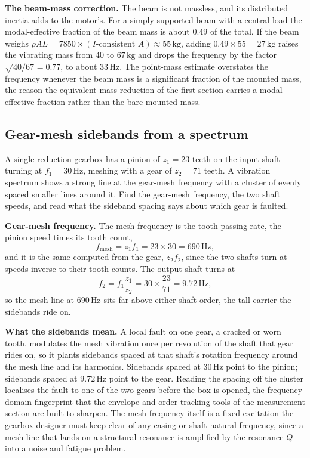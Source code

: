 \textbf{The beam-mass correction.} The beam is not massless, and its
distributed inertia adds to the motor's. For a simply supported beam
with a central load the modal-effective fraction of the beam mass is
about $0.49$ of the total. If the beam weighs $\rho A L = 7850\times
(I\text{-consistent }A)\approx 55\,\si{\kilogram}$, adding $0.49\times
55 = 27\,\si{\kilogram}$ raises the vibrating mass from $40$ to
$67\,\si{\kilogram}$ and drops the frequency by the factor
$\sqrt{40/67} = 0.77$, to about $33\,\si{\hertz}$. The point-mass
estimate overstates the frequency whenever the beam mass is a
significant fraction of the mounted mass, the reason the equivalent-mass
reduction of the first section carries a modal-effective fraction rather
than the bare mounted mass.

\subsection{Gear-mesh sidebands from a spectrum}

A single-reduction gearbox has a pinion of $z_1 = 23$ teeth on the input
shaft turning at $f_1 = 30\,\si{\hertz}$, meshing with a gear of $z_2 =
71$ teeth. A vibration spectrum shows a strong line at the gear-mesh
frequency with a cluster of evenly spaced smaller lines around it. Find
the gear-mesh frequency, the two shaft speeds, and read what the
sideband spacing says about which gear is faulted.

\textbf{Gear-mesh frequency.} The mesh frequency is the tooth-passing
rate, the pinion speed times its tooth count,
\[
f_{\text{mesh}} = z_1 f_1 = 23\times 30 = 690\,\si{\hertz},
\]
and it is the same computed from the gear, $z_2 f_2$, since the two
shafts turn at speeds inverse to their tooth counts. The output shaft
turns at
\[
f_2 = f_1\frac{z_1}{z_2} = 30\times\frac{23}{71} = 9.72\,\si{\hertz},
\]
so the mesh line at $690\,\si{\hertz}$ sits far above either shaft
order, the tall carrier the sidebands ride on.

\textbf{What the sidebands mean.} A local fault on one gear, a cracked
or worn tooth, modulates the mesh vibration once per revolution of the
shaft that gear rides on, so it plants sidebands spaced at that shaft's
rotation frequency around the mesh line and its harmonics. Sidebands
spaced at $30\,\si{\hertz}$ point to the pinion; sidebands spaced at
$9.72\,\si{\hertz}$ point to the gear. Reading the spacing off the
cluster localises the fault to one of the two gears before the box is
opened, the frequency-domain fingerprint that the envelope and
order-tracking tools of the measurement section are built to sharpen.
The mesh frequency itself is a fixed excitation the gearbox designer
must keep clear of any casing or shaft natural frequency, since a mesh
line that lands on a structural resonance is amplified by the resonance
$Q$ into a noise and fatigue problem.

